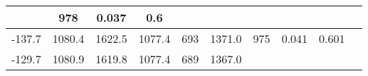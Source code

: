 \documentclass[a4paper,10pt]{article}
\begin{document}
\begin{longtable}{
     |
%    
    c|
%    
    c|
%    
    c|
%    
    c|
%    
    c|
%    
    c|
%    
    c|
%    
    c|
%    
    c|
%    
    c|
%    
    }
%        
        & 978
%        

%        

%        
        & 0.037
%        

%        

%        
        & 0.6
%        

%        
        \\
        \hline

        

%        

%        
        -137.7
%        

%        

%        
        & 1080.4
%        

%        

%        
        & 1622.5
%        

%        

%        
        & 1077.4
%        

%        

%        
        & 693
%        

%        

%        
        & 1371.0
%        

%        

%        
        & 975
%        

%        

%        
        & 0.041
%        

%        

%        
        & 0.601
%        

%        
        \\
        \hline

        

%        

%        
        -129.7
%        

%        

%        
        & 1080.9
%        

%        

%        
        & 1619.8
%        

%        

%        
        & 1077.4
%        

%        

%        
        & 689
%        

%        

%        
        & 1367.0
%        

%        


\end{longtable}
\end{document}
